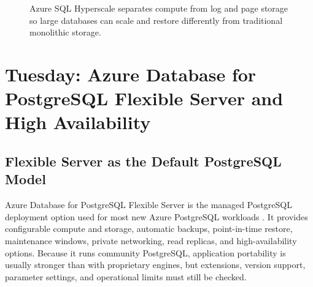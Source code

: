 \begin{figure}[H]
    \centering
    \caption{Azure SQL Hyperscale separates compute from log and page storage so large databases can scale and restore differently from traditional monolithic storage.}
    \label{fig:azure-sql-hyperscale}
\end{figure}

\section{Tuesday: Azure Database for PostgreSQL Flexible Server and High Availability}

\subsection{Flexible Server as the Default PostgreSQL Model}
Azure Database for PostgreSQL Flexible Server is the managed PostgreSQL deployment option used for most new Azure PostgreSQL workloads \cite{microsoft2025postgresflexible}. It provides configurable compute and storage, automatic backups, point-in-time restore, maintenance windows, private networking, read replicas, and high-availability options. Because it runs community PostgreSQL, application portability is usually stronger than with proprietary engines, but extensions, version support, parameter settings, and operational limits must still be checked.


